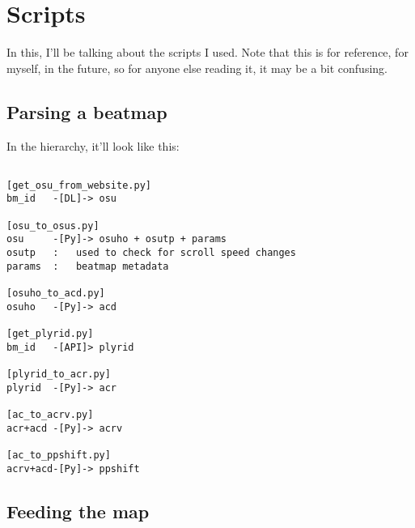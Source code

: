 

\section{Scripts}

In this, I'll be talking about the scripts I used. Note that this is for reference, for myself, in the future, so for anyone else reading it, it may be a bit confusing.

\subsection{Parsing a beatmap}

In the hierarchy, it'll look like this:

\begin{lstlisting}

[get_osu_from_website.py]
bm_id 	-[DL]-> osu

[osu_to_osus.py]
osu  	-[Py]-> osuho + osutp + params
osutp	: 	used to check for scroll speed changes
params	: 	beatmap metadata

[osuho_to_acd.py]
osuho	-[Py]->	acd

[get_plyrid.py]
bm_id	-[API]> plyrid

[plyrid_to_acr.py]
plyrid	-[Py]-> acr

[ac_to_acrv.py]
acr+acd	-[Py]-> acrv

[ac_to_ppshift.py]
acrv+acd-[Py]-> ppshift

\end{lstlisting}

\subsection{Feeding the map}

